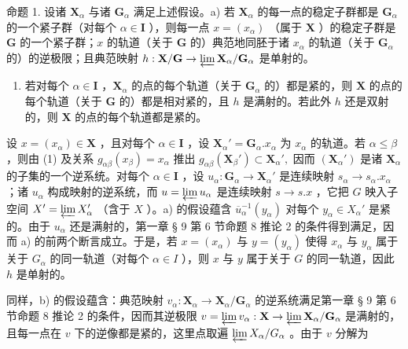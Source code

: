 命题 1. 设诸 \(\mathbf{X}_{\alpha}\) 与诸 \(\mathbf{G}_{\alpha}\) 满足上述假设。a) 若 \(\mathbf{X}_{\alpha}\) 的每一点的稳定子群都是 \(\mathbf{G}_{\alpha}\) 的一个紧子群（对每个 \(\alpha \in \mathbf{I}\) ），则每一点 \(x = (x_{\alpha})\) （属于 \(\mathbf{X}\) ）的稳定子群是 \(\mathbf{G}\) 的一个紧子群；\(x\) 的轨道（关于 \(\mathbf{G}\) 的）典范地同胚于诸 \(x_{\alpha}\) 的轨道（关于 \(\mathbf{G}_{\alpha}\) 的）的逆极限；且典范映射 \(h: \mathbf{X} / \mathbf{G} \to \varprojlim \mathbf{X}_{\alpha} / \mathbf{G}_{\alpha}\) 是单射的。

\begin{enumerate}
\def\labelenumi{\alph{enumi})}
\setcounter{enumi}{1}
\tightlist
\item
  若对每个 \(\alpha \in \mathbf{I}\) ，\(\mathbf{X}_{\alpha}\) 的点的每个轨道（关于 \(\mathbf{G}_{\alpha}\) 的）都是紧的，则 \(\mathbf{X}\) 的点的每个轨道（关于 \(\mathbf{G}\) 的）都是相对紧的，且 \(h\) 是满射的。若此外 \(h\) 还是双射的，则 \(\mathbf{X}\) 的点的每个轨道都是紧的。
\end{enumerate}

设 \(x = (x_{\alpha}) \in \mathbf{X}\) ，且对每个 \(\alpha \in \mathbf{I}\) ，设 \(\mathbf{X}_{\alpha}' = \mathbf{G}_{\alpha}.x_{\alpha}\) 为 \(x_{\alpha}\) 的轨道。若 \(\alpha \leqslant \beta\) ，则由 (1) 及关系 \(g_{\alpha\beta}(x_{\beta}) = x_{\alpha}\) 推出 \(g_{\alpha\beta}(\mathbf{X}_{\beta}') \subset \mathbf{X}_{\alpha}',\) 因而 \((\mathbf{X}_{\alpha}')\) 是诸 \(\mathbf{X}_{\alpha}\) 的子集的一个逆系统。对每个 \(\alpha \in \mathbf{I}\) ，设 \(u_{\alpha}: \mathbf{G}_{\alpha} \to \mathbf{X}_{\alpha}'\) 是连续映射 \(s_{\alpha} \to s_{\alpha}.x_{\alpha}\) ；诸 \(u_{\alpha}\) 构成映射的逆系统，而 \(u = \varprojlim u_{\alpha}\) 是连续映射 \(s \to s.x\) ，它把 \(G\) 映入子空间 \(X' = \varprojlim X_{\alpha}'\) （含于 \(X\) ）。a) 的假设蕴含 \(\overline{u}_{\alpha}^{-1}(y_{\alpha})\) 对每个 \(y_{\alpha} \in X_{\alpha}'\) 是紧的。由于 \(u_{\alpha}\) 还是满射的，第一章 § 9 第 6 节命题 8 推论 2 的条件得到满足，因而 a) 的前两个断言成立。于是，若 \(x = (x_{\alpha})\) 与 \(y = (y_{\alpha})\) 使得 \(x_{\alpha}\) 与 \(y_{\alpha}\) 属于关于 \(G_{\alpha}\) 的同一轨道（对每个 \(\alpha \in I\) ），则 \(x\) 与 \(y\) 属于关于 \(G\) 的同一轨道，因此 \(h\) 是单射的。

同样，b) 的假设蕴含：典范映射 \(v_{\alpha}: \mathbf{X}_{\alpha} \to \mathbf{X}_{\alpha}/\mathbf{G}_{\alpha}\) 的逆系统满足第一章 § 9 第 6 节命题 8 推论 2 的条件，因而其逆极限 \(v = \varprojlim v_{\alpha}: \mathbf{X} \to \varprojlim \mathbf{X}_{\alpha}/\mathbf{G}_{\alpha}\) 是满射的，且每一点在 \(v\) 下的逆像都是紧的，这里点取遍 \(\varprojlim X_{\alpha}/G_{\alpha}\) 。由于 \(v\) 分解为

